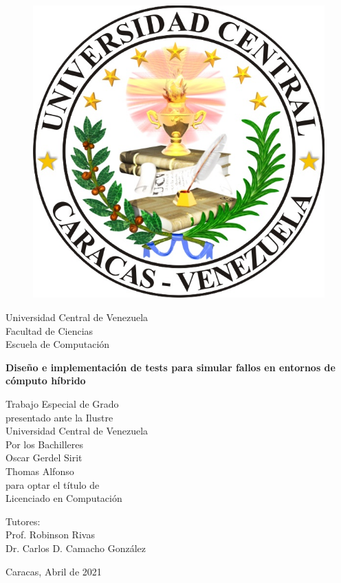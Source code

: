 \label{ch:portada}
\thispagestyle{empty}

	\begin{figure}[t]
						\centering
							\includegraphics[height=0.15\textwidth]{./images/logoUCV.jpg}
	\end{figure}
					\begin{center}
						Universidad Central de Venezuela\\
						Facultad de Ciencias\\
						Escuela de Computaci\'on\\
					\end{center}
					
					\vspace{2.2cm}
					\begin{center}
						\huge{\textbf{Diseño e implementación de tests para simular fallos en entornos de cómputo híbrido}}
					\end{center}

					\vspace{2.2cm}
					\begin{center}
						Trabajo Especial de Grado \\
						presentado ante la Ilustre\\
						Universidad Central de Venezuela\\
						Por los Bachilleres\\
						Oscar Gerdel Sirit\\
						Thomas Alfonso\\
						para optar el título de \\
						Licenciado en Computaci\'on
					\end{center}
					
					\begin{center}
						Tutores:\\
						Prof. Robinson Rivas\\
						Dr. Carlos D. Camacho Gonz\'alez
					\end{center}
					
					\vspace{1.0cm}
					\begin{center}
						Caracas, Abril de 2021
					\end{center}
						
					
